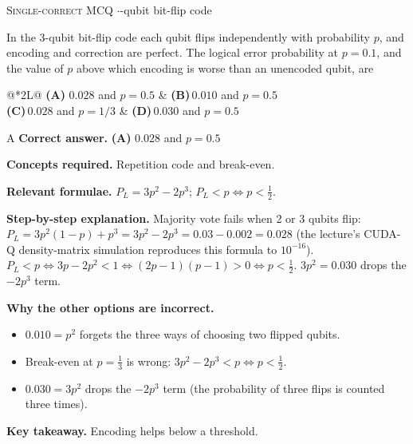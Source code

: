 \documentclass[11pt,a4paper]{article}
\newcommand{\optlabel}[1]{\textbf{(#1)}}
\newcommand{\correctlabel}[1]{\textcolor{okgreen}{\textbf{(#1)}\,\ding{51}}}
\newenvironment{qitem}[1]{\begin{list}{}{\setlength{\leftmargin}{3.3em}\setlength{\labelwidth}{3.1em}%
  \setlength{\labelsep}{0.2em}\setlength{\topsep}{3pt}\setlength{\parsep}{3pt}}\item[\textbf{Q.#1}\hfill]}{\end{list}}
\newcommand{\qsep}{\par\vspace{2pt}{\color{black!15}\hrule}\vspace{4pt}}
\newcommand{\qmeta}[2]{{\footnotesize\color{black!60}\textsc{#1} \;$\cdot$\; #2}\par}
\begin{document}
\begin{qitem}{70}
\qmeta{Single-correct MCQ}{3-qubit bit-flip code}
In the 3-qubit bit-flip code each qubit flips independently with probability $p$, and encoding and correction are perfect. The logical error probability at $p = 0.1$, and
the value of $p$ above which encoding is worse than an unencoded qubit, are
\par\smallskip\noindent\begin{tabularx}{\linewidth}{@{}*{2}{L}@{}}
\correctlabel{A}\,$0.028$ and $p = 0.5$ & \optlabel{B}\,$0.010$ and $p = 0.5$ \\[3pt]
\optlabel{C}\,$0.028$ and $p = 1/3$ & \optlabel{D}\,$0.030$ and $p = 0.5$
\end{tabularx}
\end{qitem}
\begin{solbox}{A}
\textbf{\color{brand}Correct answer.} \textcolor{okgreen}{\textbf{(A)}} $0.028$ and $p = 0.5$

\textbf{\color{brand}Concepts required.} Repetition code and break-even.

\textbf{\color{brand}Relevant formulae.} $P_L = 3p^2 - 2p^3$; $P_L < p \Leftrightarrow p < \frac12$.

\textbf{\color{brand}Step-by-step explanation.} Majority vote fails when 2 or 3 qubits flip: $P_L = 3p^2(1-p) + p^3 = 3p^2 - 2p^3 = 0.03 - 0.002 = 0.028$ (the lecture's CUDA-Q density-matrix simulation
reproduces this formula to $10^{-16}$). $P_L < p \Leftrightarrow 3p - 2p^2 < 1 \Leftrightarrow (2p - 1)(p - 1) > 0 \Leftrightarrow p < \frac12$. $3p^2 = 0.030$ drops the
$-2p^3$ term.

\textbf{\color{brand}Why the other options are incorrect.}
\begin{itemize}[leftmargin=2.4em, itemsep=1pt, topsep=2pt]
\item[\textbf{(B)}] $0.010 = p^2$ forgets the three ways of choosing two flipped qubits.
\item[\textbf{(C)}] Break-even at $p = \frac13$ is wrong: $3p^2 - 2p^3 < p \Leftrightarrow p < \frac12$.
\item[\textbf{(D)}] $0.030 = 3p^2$ drops the $-2p^3$ term (the probability of three flips is counted three times).
\end{itemize}
\textbf{\color{brand}Key takeaway.} Encoding helps below a threshold.
\end{solbox}
\qsep
\end{document}
